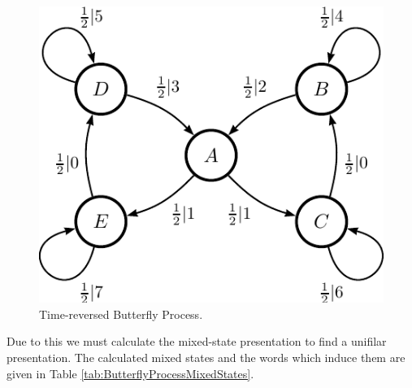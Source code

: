 \begin{figure}[th]
\centering
\includegraphics{../chapter4/figures/butterfly_TRfeM_ur}
\caption{Time-reversed Butterfly Process.}
\label{fig:TRButterflyProcess}
\end{figure}

Due to this we must calculate the mixed-state presentation to find a unifilar
presentation. The calculated mixed states and the words which induce them are
given in Table \ref{tab:ButterflyProcessMixedStates}.

